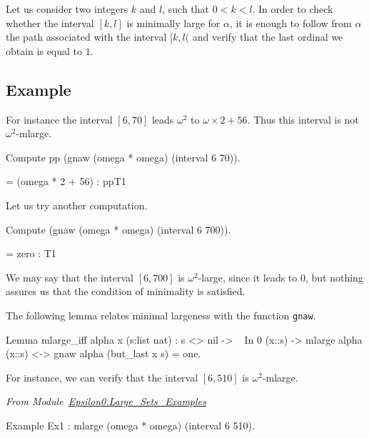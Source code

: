 Let us consider two integers $k$ and $l$, such that $0<k<l$. In order to check whether the interval $[k,l]$ is minimally large for $\alpha$, it is enough to
follow from $\alpha$ the path associated with the interval $[k,l($ and verify that the last ordinal we obtain is equal to $1$.
 
\subsection{Example}

For instance the interval $[6,70]$ leads $\omega^2$ to $\omega\times 2 + 56$. Thus this interval is not $\omega^2$-mlarge.


\begin{Coqsrc}
Compute pp (gnaw (omega * omega) (interval 6 70)).
\end{Coqsrc}

\begin{Coqanswer}
 = (omega * 2 + 56)%
     : ppT1
\end{Coqanswer}

Let us try another computation.

\begin{Coqsrc}
Compute (gnaw (omega * omega) (interval 6 700)).
\end{Coqsrc}

\begin{Coqanswer}
 = zero : T1
\end{Coqanswer}

We may say that the interval $[6,700]$ is $\omega^2$-large, since it leads to $0$, but nothing assures us that the condition of minimality is satisfied.

The following lemma relates minimal largeness with the function 
\texttt{gnaw}. 

\begin{Coqsrc}
Lemma mlarge_iff alpha x (s:list nat) :
  s <> nil -> ~ In 0 (x::s) ->
  mlarge alpha (x::s) <-> gnaw alpha (but_last x s) = one.
 \end{Coqsrc}


For instance, we can verify that the interval $[6,510]$ is $\omega^2$-mlarge.

\vspace{4pt}
 \noindent
\emph{From Module~\href{../theories/html/hydras.Epsilon0.Large_Sets_Examples.html}{Epsilon0.Large\_Sets\_Examples}}
\begin{Coqsrc}
Example Ex1 : mlarge (omega * omega) (interval 6 510).
\end{Coqsrc}


